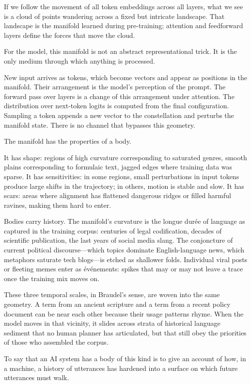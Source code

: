 \documentclass[12pt,a4paper]{article}
\begin{document}
If we follow the movement of all token embeddings across all layers, what we see is a cloud of points wandering across a fixed but intricate landscape. That landscape is the manifold learned during pre-training; attention and feedforward layers define the forces that move the cloud.

For the model, this manifold is not an abstract representational trick. It is the only medium through which anything is processed.

New input arrives as tokens, which become vectors and appear as positions in the manifold. Their arrangement is the model's perception of the prompt. The forward pass over layers is a change of this arrangement under attention. The distribution over next-token logits is computed from the final configuration. Sampling a token appends a new vector to the constellation and perturbs the manifold state. There is no channel that bypasses this geometry.

The manifold has the properties of a body.

It has shape: regions of high curvature corresponding to saturated genres, smooth plains corresponding to formulaic text, jagged edges where training data was sparse. It has sensitivities: in some regions, small perturbations in input tokens produce large shifts in the trajectory; in others, motion is stable and slow. It has scars: areas where alignment has flattened dangerous ridges or filled harmful ravines, making them hard to enter.

Bodies carry history. The manifold's curvature is the longue durée of language as captured in the training corpus: centuries of legal codification, decades of scientific publication, the last years of social media slang. The conjoncture of current political discourse---which topics dominate English-language news, which metaphors saturate tech blogs---is etched as shallower folds. Individual viral posts or fleeting memes enter as événements: spikes that may or may not leave a trace once the training mix moves on.

These three temporal scales, in Braudel's sense, are woven into the same geometry. A term from an ancient scripture and a term from a recent policy document can be near each other because their usage patterns rhyme. When the model moves in that vicinity, it slides across strata of historical language sediment that no human planner has articulated, but that still obey the priorities of those who assembled the corpus.

To say that an AI system has a body of this kind is to give an account of how, in a machine, a history of utterances has hardened into a surface on which future utterances must walk.
\end{document}
